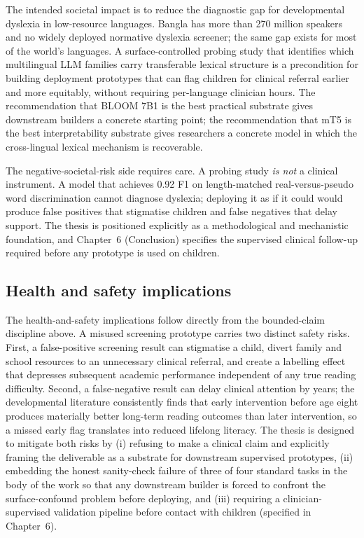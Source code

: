 The intended societal impact is to reduce the diagnostic gap for developmental dyslexia in low-resource languages. Bangla has more than 270 million speakers and no widely deployed normative dyslexia screener; the same gap exists for most of the world's languages. A surface-controlled probing study that identifies which multilingual LLM families carry transferable lexical structure is a precondition for building deployment prototypes that can flag children for clinical referral earlier and more equitably, without requiring per-language clinician hours. The recommendation that BLOOM 7B1 is the best practical substrate gives downstream builders a concrete starting point; the recommendation that mT5 is the best interpretability substrate gives researchers a concrete model in which the cross-lingual lexical mechanism is recoverable.

The negative-societal-risk side requires care. A probing study \emph{is not} a clinical instrument. A model that achieves 0.92 F1 on length-matched real-versus-pseudo word discrimination cannot diagnose dyslexia; deploying it as if it could would produce false positives that stigmatise children and false negatives that delay support. The thesis is positioned explicitly as a methodological and mechanistic foundation, and Chapter~6 (Conclusion) specifies the supervised clinical follow-up required before any prototype is used on children.

\subsection*{Health and safety implications}

The health-and-safety implications follow directly from the bounded-claim discipline above. A misused screening prototype carries two distinct safety risks. First, a false-positive screening result can stigmatise a child, divert family and school resources to an unnecessary clinical referral, and create a labelling effect that depresses subsequent academic performance independent of any true reading difficulty. Second, a false-negative result can delay clinical attention by years; the developmental literature consistently finds that early intervention before age eight produces materially better long-term reading outcomes than later intervention, so a missed early flag translates into reduced lifelong literacy. The thesis is designed to mitigate both risks by (i) refusing to make a clinical claim and explicitly framing the deliverable as a substrate for downstream supervised prototypes, (ii) embedding the honest sanity-check failure of three of four standard tasks in the body of the work so that any downstream builder is forced to confront the surface-confound problem before deploying, and (iii) requiring a clinician-supervised validation pipeline before contact with children (specified in Chapter~6).

